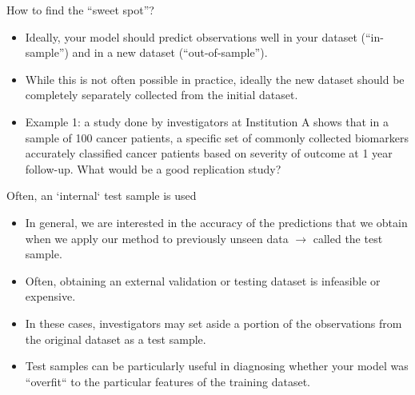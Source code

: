\documentclass[table]{beamer}\usepackage[]{graphicx}\usepackage[]{color}
\begin{document}
\begin{frame}{How to find the ``sweet spot''?}
\begin{itemize}
  \item Ideally, your model should predict observations well in your dataset (``in-sample'') and in a new dataset (``out-of-sample'').
  \item While this is not often possible in practice, ideally the new dataset should be completely separately collected from the initial dataset.
  \item Example 1: a study done by investigators at Institution A shows that in a sample of 100 cancer patients, a specific set of commonly collected biomarkers accurately classified cancer patients based on severity of outcome at 1 year follow-up. What would be a good replication study?
\end{itemize}
\end{frame}


\begin{frame}{Often, an `internal` test sample is used}
\begin{itemize}
  \item In general, we are interested in the accuracy of the predictions that we obtain when we apply our method to previously unseen data $\rightarrow$  called the {\color{violet} test sample}. \\
  \item Often, obtaining an external validation or testing dataset is infeasible or expensive.
  \item In these cases, investigators may set aside a portion of the observations from the original dataset as a {\color{violet} test sample}.
  \item Test samples can be particularly useful in diagnosing whether your model was ``overfit`` to the particular features of the training dataset.
\end{itemize}
\end{frame}


\end{document}
